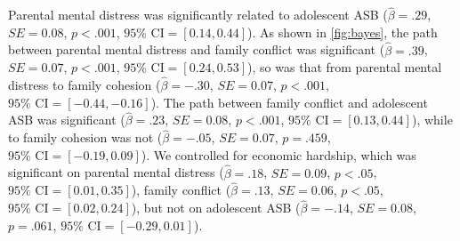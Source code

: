 
Parental mental distress was significantly related to adolescent ASB ($\hat{\beta} = .29$, $SE = 0.08$, $p < .001$, $95\% \text{ CI} = [0.14, 0.44]$). As shown in \cref{fig:bayes}, the path between parental mental distress and family conflict was significant ($\hat{\beta} = .39$, $SE = 0.07$, $p < .001$, $95\% \text{ CI} = [0.24, 0.53]$), so was that from parental mental distress to family cohesion ($\hat{\beta} = -.30$, $SE = 0.07$, $p < .001$, $95\% \text{ CI} = [-0.44, -0.16]$). The path between family conflict and adolescent ASB was significant ($\hat{\beta} = .23$, $SE = 0.08$, $p < .001$, $95\% \text{ CI} = [0.13, 0.44]$), while to family cohesion was not ($\hat{\beta} = -.05$, $SE = 0.07$, $p = .459$, $95\% \text{ CI} = [-0.19, 0.09]$). We controlled for economic hardship, which was significant on parental mental distress ($\hat{\beta} = .18$, $SE = 0.09$, $p < .05$, $95\% \text{ CI} = [0.01, 0.35]$), family conflict ($\hat{\beta} = .13$, $SE = 0.06$, $p < .05$, $95\% \text{ CI} = [0.02, 0.24]$), but not on adolescent ASB ($\hat{\beta} = -.14$, $SE = 0.08$, $p = .061$, $95\% \text{ CI} = [-0.29, 0.01]$).


